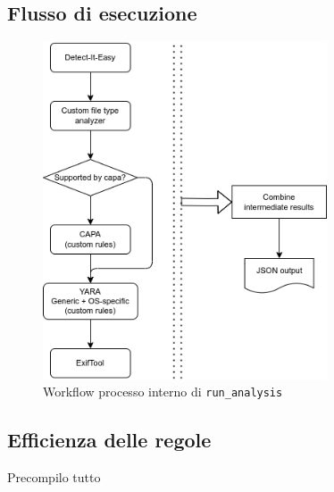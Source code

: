 \subsection{Flusso di esecuzione}
\begin{figure}[htbp]
    \centering
    \includegraphics[width=0.75\textwidth]{assets/static_run_analysis_internal_tools.png}
    \caption{Workflow processo interno di \texttt{run\_analysis}}
    \label{fig:enter-label}
\end{figure}

\subsection{Efficienza delle regole}
Precompilo tutto

